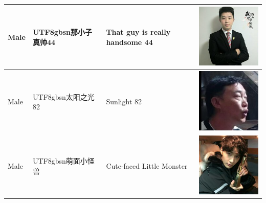\documentclass[11pt]{article}
\newcommand{\zh}[1]{\begin{CJK*}{UTF8}{gbsn}#1\end{CJK*}}
\begin{document}
\begin{table}[H]
\begin{tabular}{|p{}|p{}|p{}|p{}|}
	Male & \zh{那小子真帅44} & That guy is really handsome 44 & \begin{minipage}{.2\textwidth}\includegraphics[width=.45\linewidth, height=.45\linewidth]{figures/ordinary_avatars/m4.jpg}\end{minipage} \\ \hline
	Male & \zh{太阳之光82} & Sunlight 82 & \begin{minipage}{.2\textwidth}\includegraphics[width=.45\linewidth, height=.45\linewidth]{figures/ordinary_avatars/m5.jpg}\end{minipage} \\ \hline
	Male & \zh{萌面小怪兽} & Cute-faced Little Monster & \begin{minipage}{.2\textwidth}\includegraphics[width=.45\linewidth, height=.45\linewidth]{figures/ordinary_avatars/m6.jpg}\end{minipage} \\ \hline

\end{tabular}
\end{table}
\end{document}
